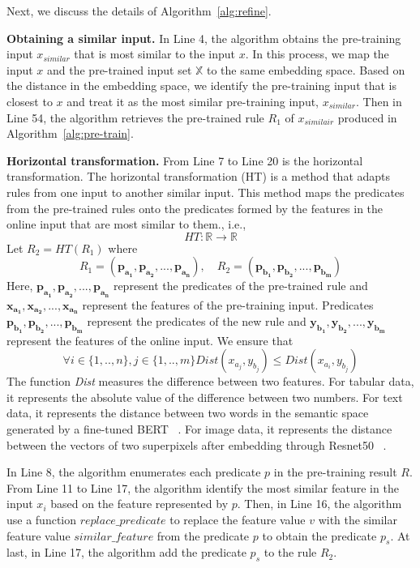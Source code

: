 Next, we discuss the details of Algorithm~\ref{alg:refine}.  

\textbf{Obtaining a similar input.} In Line 4, the algorithm obtains the pre-training input \(x_{similar}\) that is most similar to the input \(x\).  In this process, we map the input \(x\) and the pre-trained input set \(\mathbb{X}\) to the same embedding space. Based on the distance in the embedding space, we identify the pre-training input that is closest to \(x\) and treat it as the most similar pre-training input, \(x_{similar}\). Then in Line 54, the algorithm retrieves the pre-trained rule \(R_1\) of $x_{similair}$ produced in Algorithm~\ref{alg:pre-train}.

\textbf{Horizontal transformation.} From Line 7 to Line 20 is the horizontal transformation. 
The horizontal transformation (HT) is a method that adapts rules from one input to another similar input. This method maps the predicates from the pre-trained rules onto the predicates formed by the features in the online input that are most similar to them., i.e.,  
$$HT: \mathbb{R} \rightarrow \mathbb{R}$$Let $R_2=HT(R_1)$ where
$$R_1 = \boldsymbol{(p_{a_1}, p_{a_2},...,p_{a_n})}, \quad R_2 = \boldsymbol{(p_{b_1}, p_{b_2}, ..., p_{b_m})}$$
Here, \(\boldsymbol{p_{a_1}, p_{a_2},...,p_{a_n}}\) represent the predicates of the pre-trained rule and \(\boldsymbol{x_{a_1}, x_{a_2},...,x_{a_n}}\) represent the features of the pre-training input. Predicates \(\boldsymbol{p_{b_1}, p_{b_2}, ...,p_{b_m}}\) represent the predicates of the new rule and \(\boldsymbol{y_{b_1}, y_{b_2}, ...,y_{b_m}}\) represent the features of the online input. We ensure that 
$$\forall {i \in \{1, .., n\}, j \in \{1, .., m\}} Dist(x_{a_j}, y_{b_j}) \leq Dist(x_{a_i}, y_{b_j})$$
The function \emph{Dist} measures the difference between two features. For tabular data, it represents the absolute value of the difference between two numbers. For text data, it represents the distance between two words in the semantic space generated by a fine-tuned BERT ~\cite{bert}. For image data, it represents the distance between the vectors of two superpixels after embedding through Resnet50 ~\cite{resnet50}.

In Line 8, the algorithm enumerates each predicate \(p\) in the pre-training result \(R\). From Line 11 to Line 17, the algorithm identify the most similar feature in the input \(x_i\) based on the feature represented by \(p\). Then, in Line 16, the algorithm use a function \(replace\_predicate\) to replace the feature value \(v\) with the similar feature value \(similar\_feature\) from the predicate \(p\) to obtain the predicate \(p_s\). At last, in Line 17, the algorithm add the predicate \(p_s\) to the rule \(R_2\).

